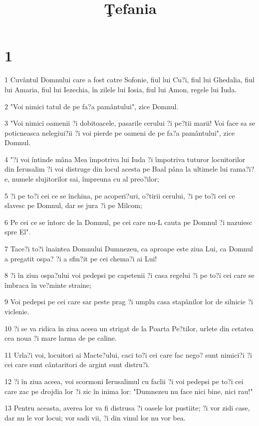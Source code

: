

\title{Ţefania}


\chapter{1}

\par 1 Cuvântul Domnului care a fost catre Sofonie, fiul lui Cu?i, fiul lui Ghedalia, fiul lui Amaria, fiul lui Iezechia, în zilele lui Iosia, fiul lui Amon, regele lui Iuda.
\par 2 "Voi nimici tatul de pe fa?a pamântului", zice Domnul.
\par 3 "Voi nimici oamenii ?i dobitoacele, pasarile cerului ?i pe?tii marii! Voi face sa se poticneasca nelegiui?ii ?i voi pierde pe oameni de pe fa?a pamântului", zice Domnul.
\par 4 "?i voi întinde mâna Mea împotriva lui Iuda ?i împotriva tuturor locuitorilor din Ierusalim ?i voi distruge din locul acesta pe Baal pâna la ultimele lui rama?i?e, numele slujitorilor sai, împreuna cu al preo?ilor;
\par 5 ?i pe to?i cei ce se închina, pe acoperi?uri, o?tirii cerului, ?i pe to?i cei ce slavesc pe Domnul, dar se jura ?i pe Milcom;
\par 6 Pe cei ce se întorc de la Domnul, pe cei care nu-L cauta pe Domnul ?i nazuiesc spre El".
\par 7 Tace?i to?i înaintea Domnului Dumnezeu, ca aproape este ziua Lui, ca Domnul a pregatit ospa? ?i a sfin?it pe cei chema?i ai Lui!
\par 8 ?i în ziua ospa?ului voi pedepsi pe capetenii ?i casa regelui ?i pe to?i cei care se îmbraca în ve?minte straine;
\par 9 Voi pedepsi pe cei care sar peste prag ?i umplu casa stapânilor lor de silnicie ?i viclenie.
\par 10 ?i se va ridica în ziua aceea un strigat de la Poarta Pe?tilor, urlete din cetatea cea noua ?i mare larma de pe caline.
\par 11 Urla?i voi, locuitori ai Macte?ului, caci to?i cei care fac nego? sunt nimici?i ?i cei care sunt cântaritori de argint sunt distru?i.
\par 12 ?i în ziua aceea, voi scormoni Ierusalimul cu faclii ?i voi pedepsi pe to?i cei care zac pe drojdia lor ?i zic în inima lor: "Dumnezeu nu face nici bine, nici rau!"
\par 13 Pentru aceasta, averea lor va fi distrusa ?i oasele lor pustiite; ?i vor zidi case, dar nu le vor locui; vor sadi vii, ?i din vinul lor nu vor bea.
